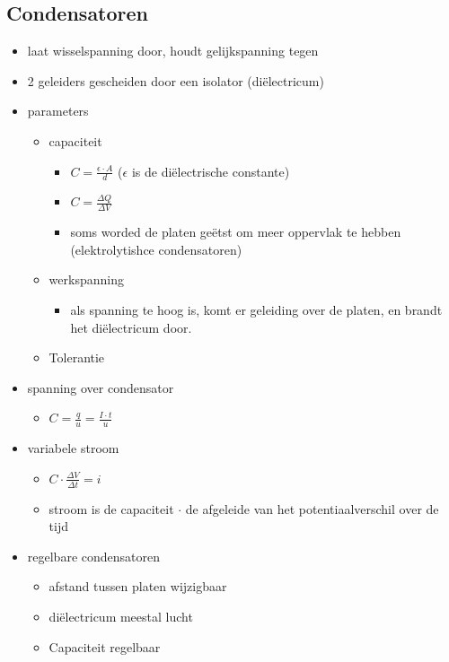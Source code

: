 \documentclass[11pt]{article}
\let\originalitem\item
\renewcommand{\item}{\originalitem[]}
\newcommand{\Newpage}{\end{preview}\begin{preview}}
\begin{document}
\begin{preview}
\Newpage
\section{Condensatoren}

\begin{itemize}
	\item laat wisselspanning door, houdt gelijkspanning tegen
	\item 2 geleiders gescheiden door een isolator (di\"electricum)
	\item parameters
	\begin{itemize}
		\item capaciteit
		\begin{itemize}
			\item $C = \frac{\epsilon \cdot A}{d} $ ($\epsilon$ is de di\"electrische constante)
			\item $C = \frac{\Delta Q}{\Delta V} $
			\item soms worded de platen ge\"etst om meer oppervlak te hebben (elektrolytishce condensatoren)
		\end{itemize} 
		\item werkspanning %
		\begin{itemize}
			\item als spanning te hoog is, komt er geleiding over de platen, en brandt het di\"electricum door.
		\end{itemize}
		\item Tolerantie
	\end{itemize}
	\item spanning over condensator
	\begin{itemize}
		\item $C = \frac{q}{u} = \frac{I \cdot t }{u} $
	\end{itemize}
	\item variabele stroom
	\begin{itemize}
		\item $C \cdot \frac{\Delta V}{\Delta t} = i $
		\item stroom is de capaciteit $\cdot$ de afgeleide van het potentiaalverschil over de tijd
	\end{itemize}
	\item regelbare condensatoren
	\begin{itemize}
		\item afstand tussen platen wijzigbaar
		\item di\"electricum meestal lucht
		\item Capaciteit regelbaar

\end{itemize}
\end{itemize}
\end{preview}
\end{document}
